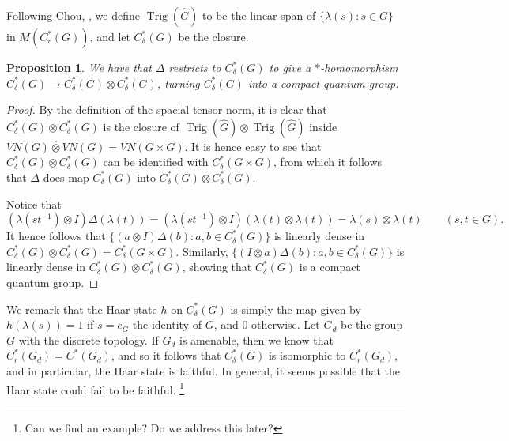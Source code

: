 \documentclass[twoside,a4paper]{article}
\newtheorem{proposition}[theorem]{Proposition}
\theoremstyle{definition}
\theoremstyle{remark}
\newcommand{\Trig}{{\operatorname{Trig}}}
\begin{document}
Following Chou, \cite{chou}, we define $\Trig(\hat G)$ to be the linear span of
$\{\lambda(s):s\in G\}$ in $M(C^*_r(G))$, and let $C^*_\delta(G)$ be the closure.

\begin{proposition}
We have that $\Delta$ restricts to $C^*_\delta(G)$ to give a $*$-homomorphism
$C^*_\delta(G) \rightarrow C^*_\delta(G)\otimes C^*_\delta(G)$, turning $C^*_\delta(G)$
into a compact quantum group.
\end{proposition}
\begin{proof}
By the definition of the spacial tensor norm, it is clear that $C^*_\delta(G)\otimes
C^*_\delta(G)$ is the closure of $\Trig(\hat G)\otimes\Trig(\hat G)$ inside
$VN(G)\overline\otimes VN(G) = VN(G\times G)$.  It is hence easy to see that
$C^*_\delta(G) \otimes C^*_\delta(G)$ can be identified with $C^*_\delta(G\times G)$,
from which it follows that $\Delta$ does map $C^*_\delta(G)$ into
$C^*_\delta(G) \otimes C^*_\delta(G)$.

Notice that
\[ (\lambda(st^{-1})\otimes I)\Delta(\lambda(t))
= (\lambda(st^{-1})\otimes I)(\lambda(t)\otimes\lambda(t))
= \lambda(s)\otimes\lambda(t) \qquad (s,t\in G). \]
It hence follows that $\{ (a\otimes I)\Delta(b) : a,b\in C^*_\delta(G) \}$ is
linearly dense in $C^*_\delta(G) \otimes C^*_\delta(G) = C^*_\delta(G\times G)$.
Similarly, $\{ (I\otimes a)\Delta(b) : a,b\in C^*_\delta(G) \}$ is
linearly dense in $C^*_\delta(G) \otimes C^*_\delta(G)$, showing that $C^*_\delta(G)$
is a compact quantum group.
\end{proof}

We remark that the Haar state $h$ on $C^*_\delta(G)$ is simply the map
given by $h(\lambda(s)) = 1$ if $s=e_G$ the identity of $G$, and $0$ otherwise.
Let $G_d$ be the group $G$ with the discrete topology.  If $G_d$ is amenable,
then we know that $C^*_r(G_d) = C^*(G_d)$, and so it follows that $C^*_\delta(G)$
is isomorphic to $C^*_r(G_d)$, and in particular, the Haar state is faithful.
In general, it seems possible that the Haar state could fail to be faithful.
\footnote{Can we find an example?  Do we address this later?}
\end{document}
